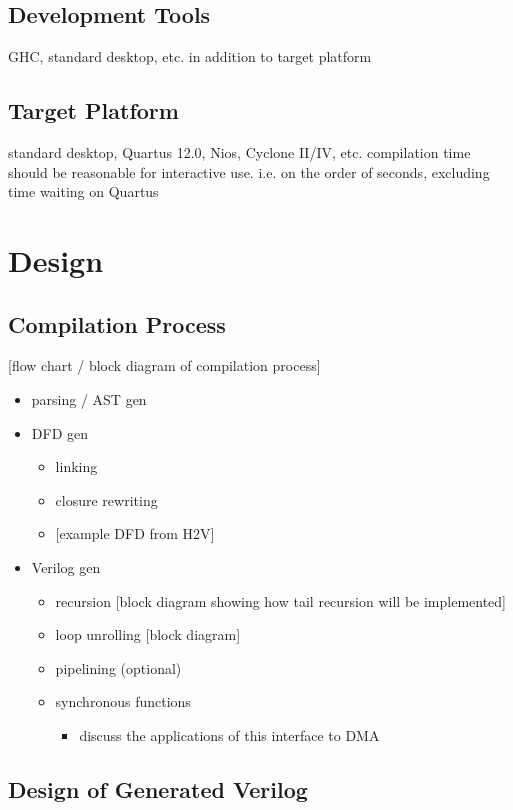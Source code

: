 \documentclass[english,onecolumn]{article}
\begin{document}
\subsection{Development Tools}
GHC, standard desktop, etc. in addition to target platform

\subsection{Target Platform}
standard desktop, Quartus 12.0, Nios, Cyclone II/IV, etc.
compilation time should be reasonable for interactive use. i.e. on
the order of seconds, excluding time waiting on Quartus

\section{Design}
\subsection{Compilation Process}

{[}flow chart / block diagram of compilation process{]}
\begin{itemize}
\item parsing / AST gen
\item DFD gen

\begin{itemize}
\item linking
\item closure rewriting
\item {[}example DFD from H2V{]}
\end{itemize}
\item Verilog gen

\begin{itemize}
\item recursion {[}block diagram showing how tail recursion will be implemented{]}
\item loop unrolling {[}block diagram{]}
\item pipelining (optional)
\item synchronous functions

\begin{itemize}
\item discuss the applications of this interface to DMA
\end{itemize}
\end{itemize}
\end{itemize}

\subsection{Design of Generated Verilog}
\end{document}
